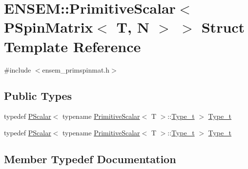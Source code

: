 \hypertarget{structENSEM_1_1PrimitiveScalar_3_01PSpinMatrix_3_01T_00_01N_01_4_01_4}{}\section{E\+N\+S\+EM\+:\+:Primitive\+Scalar$<$ P\+Spin\+Matrix$<$ T, N $>$ $>$ Struct Template Reference}
\label{structENSEM_1_1PrimitiveScalar_3_01PSpinMatrix_3_01T_00_01N_01_4_01_4}


{\ttfamily \#include $<$ensem\+\_\+primspinmat.\+h$>$}

\subsection*{Public Types}
\begin{DoxyCompactItemize}
\item 
typedef \mbox{\hyperlink{classENSEM_1_1PScalar}{P\+Scalar}}$<$ typename \mbox{\hyperlink{structENSEM_1_1PrimitiveScalar}{Primitive\+Scalar}}$<$ T $>$\+::\mbox{\hyperlink{structENSEM_1_1PrimitiveScalar_3_01PSpinMatrix_3_01T_00_01N_01_4_01_4_a90fbf3041c0d06689dfb63b1e61955f9}{Type\+\_\+t}} $>$ \mbox{\hyperlink{structENSEM_1_1PrimitiveScalar_3_01PSpinMatrix_3_01T_00_01N_01_4_01_4_a90fbf3041c0d06689dfb63b1e61955f9}{Type\+\_\+t}}
\item 
typedef \mbox{\hyperlink{classENSEM_1_1PScalar}{P\+Scalar}}$<$ typename \mbox{\hyperlink{structENSEM_1_1PrimitiveScalar}{Primitive\+Scalar}}$<$ T $>$\+::\mbox{\hyperlink{structENSEM_1_1PrimitiveScalar_3_01PSpinMatrix_3_01T_00_01N_01_4_01_4_a90fbf3041c0d06689dfb63b1e61955f9}{Type\+\_\+t}} $>$ \mbox{\hyperlink{structENSEM_1_1PrimitiveScalar_3_01PSpinMatrix_3_01T_00_01N_01_4_01_4_a90fbf3041c0d06689dfb63b1e61955f9}{Type\+\_\+t}}
\end{DoxyCompactItemize}


\subsection{Member Typedef Documentation}
\mbox{\label{structENSEM_1_1PrimitiveScalar_3_01PSpinMatrix_3_01T_00_01N_01_4_01_4_a90fbf3041c0d06689dfb63b1e61955f9}} 
